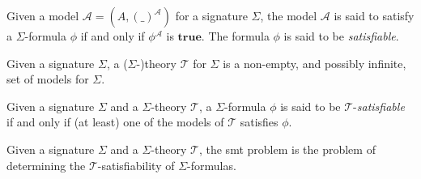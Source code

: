 \begin{definition}[Satisfiability]
  Given a model $\mathcal{A} = (A, (\_)^{\mathcal{A}})$ for a signature
  $\Sigma{}$, the model $\mathcal{A}$ is said to satisfy a $\Sigma{}$-formula
  $\phi{}$ if and only if $\phi{}^{\mathcal{A}}$ is $\mathbf{true}$.
  The formula $\phi{}$ is said to be \textit{satisfiable}.
\end{definition}

\begin{definition}[Theory]\label{def:theory}
  Given a signature $\Sigma{}$, a ($\Sigma{}$-)theory $\mathcal{T}$ for
  $\Sigma{}$ is a non-empty, and possibly infinite, set of models for $\Sigma{}$.
\end{definition}

\begin{definition}
  Given a signature $\Sigma{}$ and a $\Sigma{}$-theory $\mathcal{T}$, a
  $\Sigma{}$-formula $\phi{}$ is said to be $\mathcal{T}$-\textit{satisfiable}
  if and only if (at least) one of the models of $\mathcal{T}$ satisfies
  $\phi{}$.
\end{definition}

\begin{definition}
  Given a signature $\Sigma{}$ and a $\Sigma{}$-theory $\mathcal{T}$, the
  \gls{smt} problem is the problem of determining the
  $\mathcal{T}$-satisfiability of $\Sigma{}$-formulas.
\end{definition}
